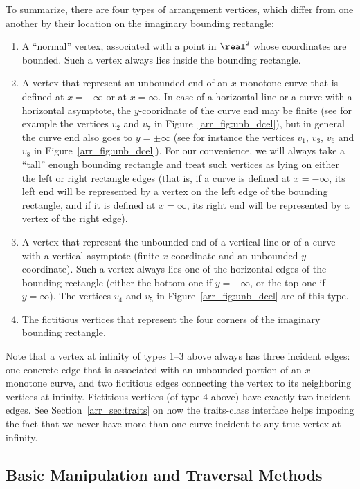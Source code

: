 To summarize, there are four types of arrangement vertices, which
differ from one another by their location on the imaginary bounding
rectangle:
\begin{enumerate}
\item
A ``normal'' vertex, associated with a point in $\real^2$ whose
coordinates are bounded. Such a vertex always lies inside the
bounding rectangle.
\item
A vertex that represent an unbounded end of an $x$-monotone curve
that is defined at $x = -\infty$ or at $x = \infty$. In case of
a horizontal line or a curve with a horizontal asymptote, the
$y$-cooridnate of the curve end may be finite (see for example the
vertices $v_2$ and $v_7$ in Figure~\ref{arr_fig:unb_dcel}), but in
general the curve end also goes to $y = \pm\infty$ (see for instance
the vertices $v_1$, $v_3$, $v_6$ and $v_8$ in
Figure~\ref{arr_fig:unb_dcel}). For our convenience, we will always
take a ``tall'' enough bounding rectangle and treat such vertices as
lying on either the left or right rectangle edges (that is, if a curve
is defined at $x = -\infty$, its left end will be represented by
a vertex on the left edge of the bounding rectangle, and if it is
defined at $x = \infty$, its right end will be represented by a
vertex of the right edge).
\item
A vertex that represent the unbounded end of a vertical line or of a
curve with a vertical asymptote (finite $x$-coordinate and an
unbounded $y$-coordinate). Such a vertex always lies one of the
horizontal edges of the bounding rectangle (either the bottom one if
$y = -\infty$, or the top one if $y = \infty$). The vertices $v_4$
and $v_5$ in Figure~\ref{arr_fig:unb_dcel} are of this type.
\item
The fictitious vertices that represent the four corners of the
imaginary bounding rectangle.
\end{enumerate}
Note that a vertex at infinity of types 1--3 above always has
three incident edges: one concrete edge that is associated with an
unbounded portion of an $x$-monotone curve, and two fictitious edges
connecting the vertex to its neighboring vertices at infinity.
Fictitious vertices (of type 4 above) have exactly two incident edges.
See Section~\ref{arr_sec:traits} on how the traits-class interface
helps imposing the fact that we never have more than one curve
incident to any true vertex at infinity.

\subsection{Basic Manipulation and Traversal Methods\label{arr_ssec:unb_basic}}

